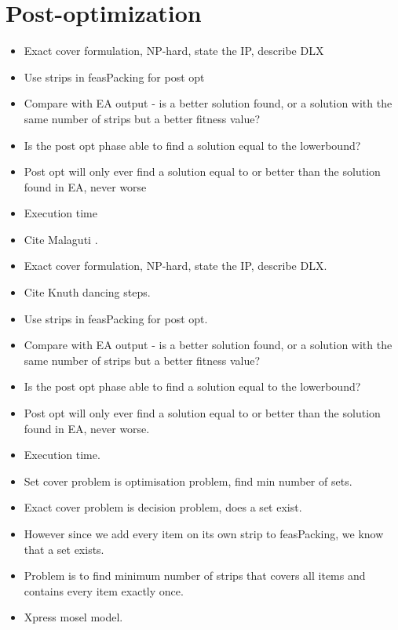 \documentclass{elsarticle}
\begin{document}
\section{Post-optimization}
\begin{itemize}
	\item Exact cover formulation, NP-hard, state the IP, describe DLX
	\item Use strips in feasPacking for post opt
	\item Compare with EA output - is a better solution found, or a solution with the same number of strips but a better fitness value?
	\item Is the post opt phase able to find a solution equal to the lowerbound?
	\item Post opt will only ever find a solution equal to or better than the solution found in EA, never worse
	\item Execution time
\end{itemize}

{\color{myGreen}
	\begin{itemize}[leftmargin=*]
		\item Cite Malaguti \cite{malaguti2008}.
		\item Exact cover formulation, NP-hard, state the IP, describe DLX.
		\item Cite Knuth \cite{knuth2000} dancing steps.
		\item Use strips in feasPacking for post opt.
		\item Compare with EA output - is a better solution found, or a solution with the same number of strips but a better fitness value?
		\item Is the post opt phase able to find a solution equal to the lowerbound?
		\item Post opt will only ever find a solution equal to or better than the solution found in EA, never worse.
		\item Execution time.
		\item Set cover problem is optimisation problem, find min number of sets.
		\item Exact cover problem is decision problem, does a set exist.
		\item However since we add every item on its own strip to feasPacking, we know that a set exists.
		\item Problem is to find minimum number of strips that covers all items and contains every item exactly once.
		\item Xpress mosel model.
	\end{itemize}
}
\end{document}
